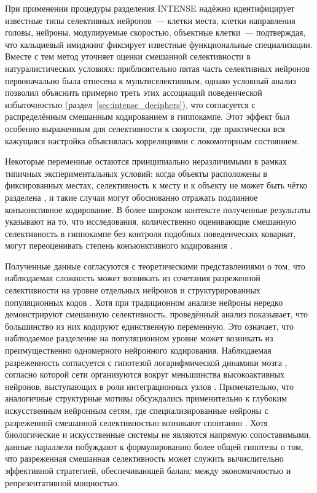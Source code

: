 При применении процедуры разделения INTENSE надёжно идентифицирует известные типы селективных нейронов~--- клетки места, клетки направления головы, нейроны, модулируемые скоростью, объектные клетки~--- подтверждая, что кальциевый имиджинг фиксирует известные функциональные специализации. Вместе с тем метод уточняет оценки смешанной селективности в натуралистических условиях: приблизительно пятая часть селективных нейронов первоначально была отнесена к мультиселективным, однако условный анализ позволил объяснить примерно треть этих ассоциаций поведенческой избыточностью (раздел~\ref{sec:intense_deciphers}), что согласуется %
с распределённым смешанным кодированием в гиппокампе. Этот эффект был особенно выраженным для селективности к скорости, где практически вся кажущаяся настройка объяснялась корреляциями с локомоторным состоянием.

Некоторые переменные остаются принципиально неразличимыми в рамках типичных экспериментальных условий: когда объекты расположены в фиксированных местах, селективность к месту и к объекту не может быть чётко разделена \cite{Plusnin2021}, и такие случаи могут обоснованно отражать подлинное конъюнктивное кодирование. В более широком контексте полученные результаты указывают на то, что исследования, количественно оценивающие смешанную селективность в гиппокампе без контроля подобных поведенческих ковариат, могут переоценивать степень конъюнктивного кодирования \cite{TyeMiller2024}.

Полученные данные согласуются с теоретическими представлениями о том, что наблюдаемая сложность может возникать из сочетания разреженной селективности на уровне отдельных нейронов и структурированных популяционных кодов \cite{Keinath2025}. Хотя при традиционном анализе нейроны нередко демонстрируют смешанную селективность, проведённый анализ показывает, что большинство из них кодируют единственную переменную. Это означает, что наблюдаемое разделение на популяционном уровне может возникать из преимущественно одномерного нейронного кодирования. Наблюдаемая разреженность согласуется с гипотезой логарифмической динамики мозга \cite{Buzsaki2014}, согласно которой сети организуются вокруг меньшинства высокоактивных нейронов, выступающих в роли интеграционных узлов \cite{Fusi2016}. Примечательно, что аналогичные структурные мотивы обсуждались применительно к глубоким искусственным нейронным сетям, где специализированные нейроны с разреженной смешанной селективностью возникают спонтанно \cite{Johnston2023, templeton2024scaling}. Хотя биологические и искусственные системы не являются напрямую сопоставимыми, данные параллели побуждают к формулированию более общей гипотезы о том, что разреженная смешанная селективность может служить вычислительно эффективной стратегией, обеспечивающей баланс между экономичностью и репрезентативной мощностью.

